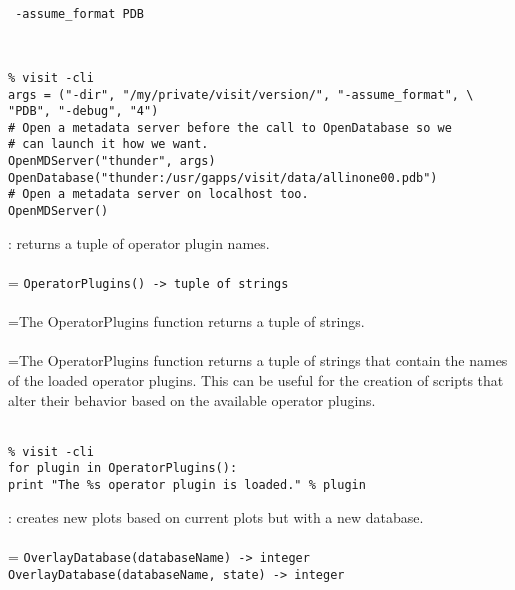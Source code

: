 \documentclass[10pt,a4paper]{report}
\begin{document}
\\[-6mm]
\begin{verbatim} -assume_format PDB
\end{verbatim}
\\[-6mm]
\begin{verbatim}% visit -cli
args = ("-dir", "/my/private/visit/version/", "-assume_format", \
"PDB", "-debug", "4")
# Open a metadata server before the call to OpenDatabase so we 
# can launch it how we want.
OpenMDServer("thunder", args)
OpenDatabase("thunder:/usr/gapps/visit/data/allinone00.pdb")
# Open a metadata server on localhost too.
OpenMDServer()
\end{verbatim}
\newpage


{}
: returns a tuple of operator plugin names.\\[-3mm]

 \\ 
\hangindent=\parindent 
\verb!OperatorPlugins() -> tuple of strings!\\ [-3mm]

 \\ 
\hangindent=\parindent The OperatorPlugins function returns a tuple of strings. \\[-3mm] 

 \\ 
\hangindent=\parindent The OperatorPlugins function returns a tuple of strings that contain the names of the loaded operator plugins. This can be useful for the creation of scripts that alter their behavior based on the available operator plugins. \\[-3mm] 

\\[-6mm]
\begin{verbatim}% visit -cli
for plugin in OperatorPlugins():
print "The %s operator plugin is loaded." % plugin
\end{verbatim}
\newpage


{}
: creates new plots based on current plots but with a new database.\\[-3mm]

 \\ 
\hangindent=\parindent 
\verb!OverlayDatabase(databaseName) -> integer!\\ 
\verb!OverlayDatabase(databaseName, state) -> integer!\\ [-3mm]
\end{document}
